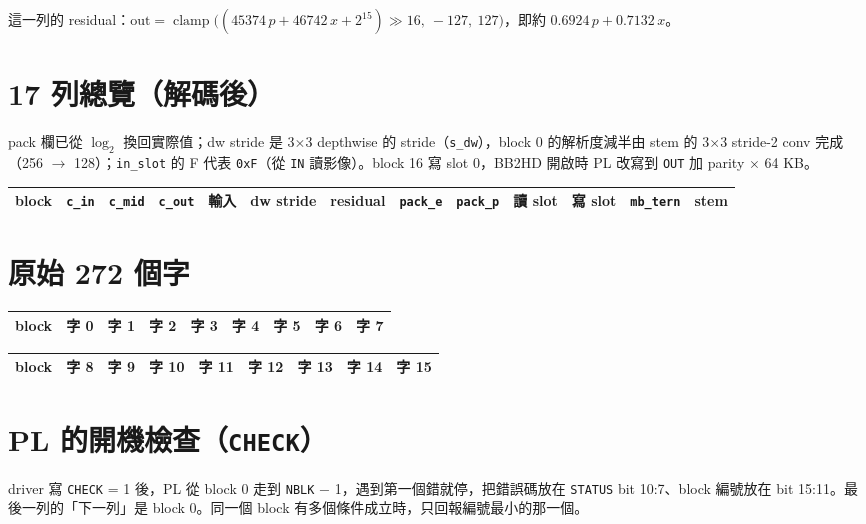 \documentclass[10pt,a4paper]{article}
\newcommand{\f}[1]{\texttt{#1}}
\begin{document}
這一列的 residual：$\text{out} = \operatorname{clamp}\big((45374\,p + 46742\,x + 2^{15}) \gg 16,\ -127,\ 127\big)$，即約 $0.6924\,p + 0.7132\,x$。

\newpage
\section{17 列總覽（解碼後）}
pack 欄已從 $\log_2$ 換回實際值；dw stride 是 3$\times$3 depthwise 的 stride（\f{s\_dw}），block 0 的解析度減半由 stem 的 3$\times$3 stride-2 conv 完成（256 $\rightarrow$ 128）；\f{in\_slot} 的 F 代表 \f{0xF}（從 \f{IN} 讀影像）。block 16 寫 slot 0，BB2HD 開啟時 PL 改寫到 \f{OUT} 加 parity $\times$ 64 KB。

\footnotesize
\begin{longtable}{@{}rrrrcccrrcccc@{}}
\toprule
block & \f{c\_in} & \f{c\_mid} & \f{c\_out} & 輸入 & dw stride & residual & \f{pack\_e} & \f{pack\_p} & 讀 slot & 寫 slot & \f{mb\_tern} & stem \\
\midrule
\endhead

\end{longtable}
\normalsize

\section{原始 272 個字}
\footnotesize
\begin{tabular}{@{}r*{8}{c}@{}}
\toprule
block & 字 0 & 字 1 & 字 2 & 字 3 & 字 4 & 字 5 & 字 6 & 字 7 \\
\midrule

\end{tabular}

\medskip
\begin{tabular}{@{}r*{8}{c}@{}}
\toprule
block & 字 8 & 字 9 & 字 10 & 字 11 & 字 12 & 字 13 & 字 14 & 字 15 \\
\midrule

\end{tabular}
\normalsize

\section{PL 的開機檢查（\f{CHECK}）}
driver 寫 \f{CHECK} = 1 後，PL 從 block 0 走到 \f{NBLK} $-$ 1，遇到第一個錯就停，把錯誤碼放在 \f{STATUS} bit 10:7、block 編號放在 bit 15:11。最後一列的「下一列」是 block 0。同一個 block 有多個條件成立時，只回報編號最小的那一個。
\end{document}

